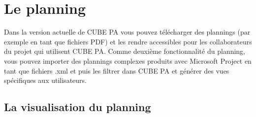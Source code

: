 
\pagebreak	
\section{Le planning}
\label{bkm:Ref445400921}
Dans la version actuelle de CUBE PA vous pouvez télécharger des plannings (par exemple en tant que fichiers PDF) et les rendre accessibles pour les collaborateurs du projet qui utilisent CUBE PA.
Comme deuxième fonctionnalité du planning, vous pouvez importer des plannings complexes produits avec Microsoft Project en tant que fichiers .xml et puis les filtrer dans CUBE PA et générer des vues spécifiques aux utilisateurs.


\subsection{La visualisation du planning}

